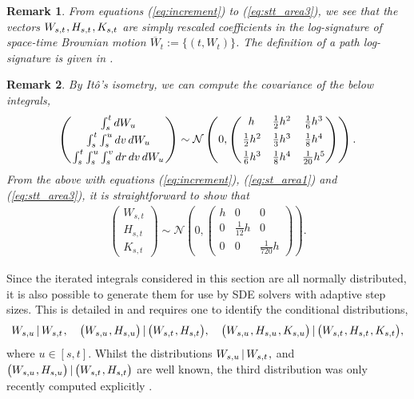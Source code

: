 \documentclass[sn-mathphys-num]{sn-jnl}%
\newtheorem{remark}{Remark}%
\newcommand{\m}{\hspace{0.25mm}}
\begin{document}
\begin{remark}
From equations (\ref{eq:increment}) to (\ref{eq:stt_area3}), we see that the vectors $W_{s,t}\m, H_{s,t}\m, K_{s,t}$ are simply rescaled coefficients in the log-signature of space-time Brownian motion $\overline{W}_t := \{(t, W_t)\}$. The definition of a path log-signature is given in \cite[Section 2.2.4]{lyons2007roughpaths}.
\end{remark}\medbreak
\begin{remark}
By It\^{o}'s isometry, we can compute the covariance of the below integrals,
\begin{align*}
\begin{pmatrix}
\int_s^t dW_u \\[2pt] \int_s^t\int_s^u dv\, dW_u \\[2pt] \m\int_s^t\int_s^u\int_s^v dr\, dv\, dW_u
\m\end{pmatrix} \sim \mathcal{N}\left(0, \begin{pmatrix}
h & \frac{1}{2} h^2 & \frac{1}{6} h^3 \\[4pt]
\m\frac{1}{2} h^2 & \frac{1}{3} h^3 & \frac{1}{8} h^4 \\[4pt]
\m\frac{1}{6} h^3 & \frac{1}{8} h^4 & \frac{1}{20} h^5
\end{pmatrix}\right).
\end{align*}
From the above with equations (\ref{eq:increment}), (\ref{eq:st_area1}) and (\ref{eq:stt_area3}), it is straightforward to show that
\begin{align*}
\begin{pmatrix} W_{s,t} \\[2pt] H_{s,t} \\[2pt] K_{s,t} \end{pmatrix} \sim \mathcal{N}\left(0, \begin{pmatrix}
h & 0 & 0 \\[1pt] 0 & \frac{1}{12}h & 0 \\[1pt] 0 & 0 & \frac{1}{720}h
\end{pmatrix}\right).
\end{align*}
\end{remark}

Since the iterated integrals considered in this section are all normally distributed, it is also possible to generate them for use by SDE solvers with adaptive step sizes.
This is detailed in \cite{foster2020thesis, jelincic2024vbt} and requires one to identify the conditional distributions,
\begin{align*}
W_{s,u} \,|\, W_{s,t}\m,\quad \big(W_{s,u}\m, H_{s,u}\big) \,|\, \big(W_{s,t}\m, H_{s,t}\big),\quad \big(W_{s,u}\m, H_{s,u}\m, K_{s,u}\big) \,|\, \big(W_{s,t}\m, H_{s,t}\m, K_{s,t}\big), 
\end{align*}
where $u\in[s,t]$. Whilst the distributions $W_{s,u} \,|\, W_{s,t}\m,$ and $\big(W_{s,u}\m, H_{s,u}\big) \,|\, \big(W_{s,t}\m, H_{s,t}\big)$\vspace{0.5mm} are well known, the third distribution was only recently computed explicitly \cite{foster2020thesis, jelincic2024vbt}.\medbreak
\end{document}

